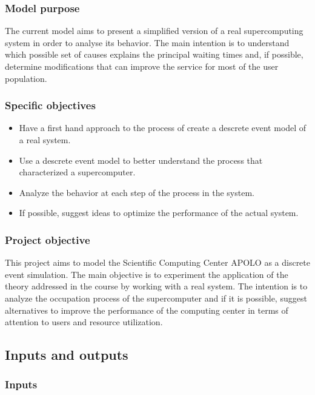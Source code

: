 \documentclass{wscpaperproc}
\begin{document}
\subsubsection{Model purpose}

The current model aims to present a simplified version of a real supercomputing
system in order to analyse its behavior. The main intention is to understand
which possible set of causes explains the principal waiting times and, if
possible, determine modifications that can improve the service for most
of the user population.

\subsubsection{Specific objectives}

\begin{itemize}
    \item Have a first hand approach to the process of create a descrete event
          model of a real system.
    \item Use a descrete event model to better understand the process that
          characterized a supercomputer.
    \item Analyze the behavior at each step of the process in the system.
    \item If possible, suggest ideas to optimize the performance of the actual
          system.
\end{itemize}

\subsubsection{Project objective}

This project aims to model the Scientific Computing Center APOLO as a
discrete event simulation. The main objective is to experiment the
application of the theory addressed in the course by working with a real
system. The intention is to analyze the occupation process of the
supercomputer and if it is possible, suggest alternatives to improve
the performance of the computing center in terms of attention to users
and resource utilization.

\subsection{Inputs and outputs}

\subsubsection{Inputs}
\end{document}
